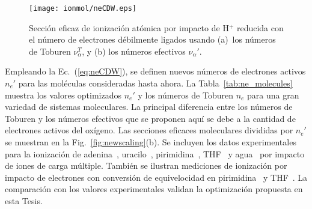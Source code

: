 \begin{figure}[t]
\centering
\texttt{[image: ionmol/neCDW.eps]}
\caption[Sección eficaz de ionización atómica reducida por $n_e$.]
{Sección eficaz de ionización atómica por impacto de H$^+$ reducida con 
el número de electrones débilmente ligados usando 
(a)~los números de Toburen $\nu_{\alpha}^T$, y 
(b) los números efectivos $\nu_{\alpha}'$.}
\label{fig:neCDW}
\end{figure}

Empleando la Ec.~(\ref{eq:neCDW}), se definen nuevos números de 
electrones activos $n_e'$ para las moléculas consideradas hasta ahora.  
La Tabla~\ref{tab:ne_molecules} muestra los valores optimizados $n_e'$ y 
los números de Toburen $n_e$ para una gran variedad de sistemas 
moleculares. La principal diferencia entre los números de Toburen y los 
números efectivos que se proponen aquí se debe a la cantidad de 
electrones activos del oxígeno.
Las secciones eficaces moleculares divididas por $n_e'$ se muestran en 
la Fig.~\ref{fig:newscaling}(b). Se incluyen los datos experimentales 
para la ionización de 
adenina~\cite{Iriki:11,Sens:20,Bhattacharjee:19}, 
uracilo~\cite{itoh2013,Sens:20}, 
pirimidina~\cite{wolff2014}, 
THF~\cite{wang2016} y 
agua~\cite{Luna2007,Bolorizadeh86,H_Rudd85,toburen80,Ohsawa05,He_Rudd85,
DalCappello:09,Bhattacharjee:17,Bhattacharjee:16} por impacto de iones 
de carga múltiple. También se ilustran mediciones de ionización por 
impacto de electrones con conversión de equivelocidad en 
pirimidina~\cite{bug2017} y THF~\cite{bug2017,wolf2019,fuss2009}. 
La comparación con los valores experimentales validan la optimización 
propuesta en esta Tesis. 

